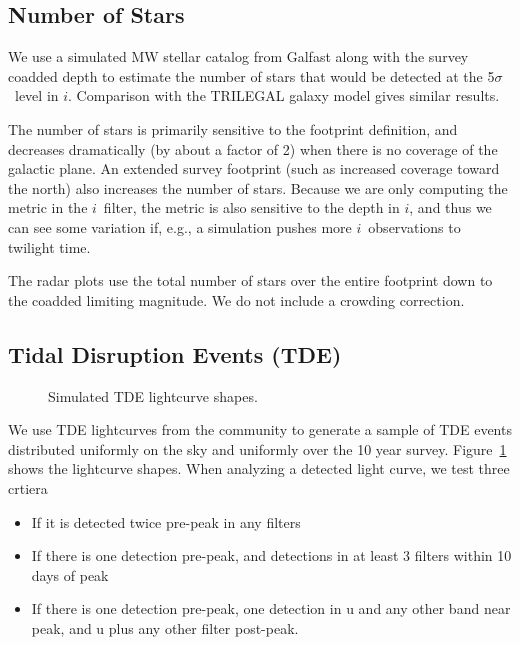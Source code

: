 \subsection{Number of Stars}

We use a simulated MW stellar catalog from Galfast \citep{2008ApJ...673..864J, 2018ascl.soft10001J} along with the survey coadded depth to estimate the number of stars that would be detected at the 5$\sigma$\ level in $i$. Comparison with the TRILEGAL galaxy model \citep{2005A&A...436..895G, 2012ASSP...26..165G} gives similar results.

The number of stars is primarily sensitive to the footprint definition, and decreases dramatically (by about a factor of 2) when there is no coverage of the galactic plane. An extended survey footprint (such as increased coverage toward the north) also increases the number of stars. Because we are only computing the metric in the $i$\ filter, the metric is also sensitive to the depth in $i$, and thus we can see some variation if, e.g., a simulation pushes more $i$\ observations to twilight time.

The radar plots use the total number of stars over the entire footprint down to the coadded limiting magnitude. We do not include a crowding correction.

\subsection{Tidal Disruption Events (TDE)}

\begin{figure}
\caption{Simulated TDE lightcurve shapes.}\label{fig:tdelc}
\end{figure}

We use TDE lightcurves from the community to generate a sample of TDE events distributed uniformly on the sky and uniformly over the 10 year survey.  Figure~\ref{fig:tdelc} shows the lightcurve shapes. When analyzing a detected light curve, we test three crtiera
\begin{itemize}
    \item{If it is detected twice pre-peak in any filters}
    \item{If there is one detection pre-peak, and detections in at least 3 filters within 10 days of peak}
    \item{If there is one detection pre-peak, one detection in u and any other band near peak, and u plus any other filter post-peak.}
\end{itemize}

